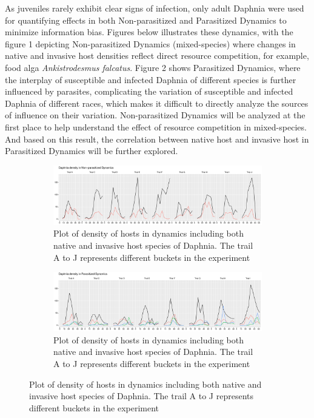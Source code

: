 \documentclass[12pt]{article}
\begin{document}
As juveniles rarely exhibit clear signs of infection, only adult Daphnia were used for quantifying effects in both Non-parasitized and Parasitized Dynamics to minimize information bias. Figures below illustrates these dynamics, with the figure 1 depicting Non-parasitized Dynamics (mixed-species) where changes in native and invasive host densities reflect direct resource competition, for example, food alga \textit{Ankistrodesmus falcatus}. Figure 2 shows Parasitized Dynamics, where the interplay of susceptible and infected Daphnia of different species is further influenced by parasites, complicating the variation of susceptible and infected Daphnia of different races, which makes it difficult to directly analyze the sources of influence on their variation. Non-parasitized Dynamics will be analyzed at the first place to help understand the effect of resource competition in mixed-species. And based on this result, the correlation between native host and invasive host in Parasitized Dynamics will be further explored.

\begin{figure}[htbp]
\centering
\begin{subfigure}[b]{\linewidth}
\includegraphics{ms-002}
\caption{Plot of density of hosts in dynamics including both native and invasive host species of Daphnia. The trail A to J represents different buckets in the experiment}
\end{subfigure}
\begin{subfigure}[b]{\linewidth}
\includegraphics{ms-003}
\caption{Plot of density of hosts in dynamics including both native and invasive host species of Daphnia. The trail A to J represents different buckets in the experiment}
\end{subfigure}%
\end{figure}
\end{document}
